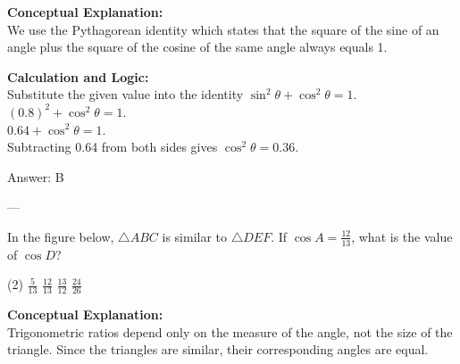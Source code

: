 \documentclass[11pt,paper=a4,answers]{exam}
\begin{document}
\begin{questions}
\begin{solution}
\textbf{Conceptual Explanation:} \\
We use the Pythagorean identity which states that the square of the sine of an angle plus the square of the cosine of the same angle always equals 1.

\vspace{10pt}
\textbf{Calculation and Logic:} \\
Substitute the given value into the identity $\sin^2 \theta + \cos^2 \theta = 1$. \\
$(0.8)^2 + \cos^2 \theta = 1$. \\
$0.64 + \cos^2 \theta = 1$. \\
Subtracting 0.64 from both sides gives $\cos^2 \theta = 0.36$.

\vspace{15pt}
Answer: \colorbox{yellow!100}{B}
\end{solution}

---

\question
In the figure below, $\triangle ABC$ is similar to $\triangle DEF$. If $\cos A = \frac{12}{13}$, what is the value of $\cos D$?
\begin{center}
\end{center}
\begin{tasks}(2)
    \task $\frac{5}{13}$
    \task $\frac{12}{13}$
    \task $\frac{13}{12}$
    \task $\frac{24}{26}$
\end{tasks}

\begin{solution}
\textbf{Conceptual Explanation:} \\
Trigonometric ratios depend only on the measure of the angle, not the size of the triangle. Since the triangles are similar, their corresponding angles are equal.


\end{solution}
\end{questions}
\end{document}
